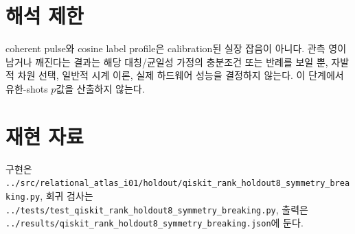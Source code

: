 \documentclass[11pt]{article}
\begin{document}
\section*{해석 제한}
coherent pulse와 cosine label profile은 calibration된 실장 잡음이 아니다.
관측 영이 남거나 깨진다는 결과는 해당 대칭/균일성 가정의 충분조건 또는
반례를 보일 뿐, 자발적 차원 선택, 일반적 시계 이론, 실제 하드웨어 성능을
결정하지 않는다. 이 단계에서 유한-shots $p$값을 산출하지 않는다.

\section*{재현 자료}
구현은 \texttt{../src/relational\_atlas\_i01/holdout/qiskit\_rank\_holdout8\_symmetry\_breaking.py},
회귀 검사는 \texttt{../tests/test\_qiskit\_rank\_holdout8\_symmetry\_breaking.py},
출력은 \texttt{../results/qiskit\_rank\_holdout8\_symmetry\_breaking.json}에 둔다.
\end{document}
